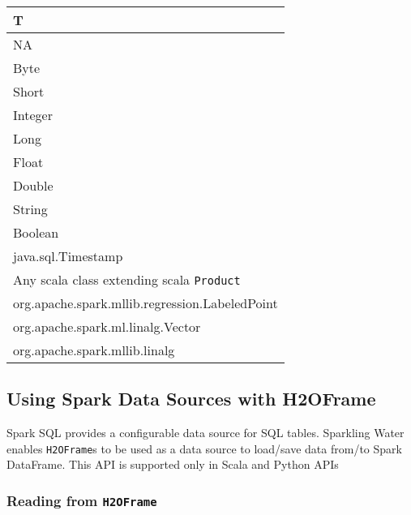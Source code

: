 \documentclass{standalone}
\begin{document}
    \begin{table}[!ht]
        \centering
        \begin{tabular}{l}
            \toprule
            \textbf{T}                                       \\
            \midrule
            NA                                               \\
            Byte                                             \\
            Short                                            \\
            Integer                                          \\
            Long                                             \\
            Float                                            \\
            Double                                           \\
            String                                           \\
            Boolean                                          \\
            java.sql.Timestamp                               \\
            Any scala class extending scala \texttt{Product} \\
            org.apache.spark.mllib.regression.LabeledPoint   \\
            org.apache.spark.ml.linalg.Vector                \\
            org.apache.spark.mllib.linalg                    \\
            \bottomrule
        \end{tabular}
    \end{table}

    \subsection{Using Spark Data Sources with H2OFrame}
    Spark SQL provides a configurable data source for SQL tables. Sparkling Water enables \texttt{H2OFrame}s to be
    used as a data source to load/save data from/to Spark DataFrame. This API is supported only in Scala and
    Python APIs

    \subsubsection{Reading from \texttt{H2OFrame}}
\end{document}
